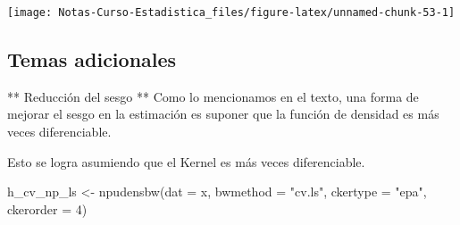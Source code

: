 \documentclass[
  12pt,
]{book}
\newenvironment{Shaded}{\begin{snugshade}}{\end{snugshade}}
\newcommand{\AttributeTok}[1]{\textcolor[rgb]{0.77,0.63,0.00}{#1}}
\newcommand{\DecValTok}[1]{\textcolor[rgb]{0.00,0.00,0.81}{#1}}
\newcommand{\FunctionTok}[1]{\textcolor[rgb]{0.00,0.00,0.00}{#1}}
\newcommand{\NormalTok}[1]{#1}
\newcommand{\OtherTok}[1]{\textcolor[rgb]{0.56,0.35,0.01}{#1}}
\newcommand{\SpecialCharTok}[1]{\textcolor[rgb]{0.00,0.00,0.00}{#1}}
\newcommand{\StringTok}[1]{\textcolor[rgb]{0.31,0.60,0.02}{#1}}
\theoremstyle{definition}
\theoremstyle{definition}
\theoremstyle{definition}
\theoremstyle{remark}
\begin{document}
\begin{Shaded}
\end{Shaded}

\begin{center}\texttt{[image: Notas-Curso-Estadistica\_files/figure-latex/unnamed-chunk-53-1]} \end{center}

\hypertarget{temas-adicionales}{%
\subsection{Temas adicionales}\label{temas-adicionales}}

** Reducción del sesgo **
Como lo mencionamos en el texto, una forma de mejorar el sesgo en la estimación es suponer que la función de densidad es más veces diferenciable.

Esto se logra asumiendo que el Kernel es más veces diferenciable.

\begin{Shaded}
\begin{Highlighting}[]
\NormalTok{h\_cv\_np\_ls }\OtherTok{\textless{}{-}} \FunctionTok{npudensbw}\NormalTok{(}\AttributeTok{dat =}\NormalTok{ x, }\AttributeTok{bwmethod =} \StringTok{"cv.ls"}\NormalTok{, }
    \AttributeTok{ckertype =} \StringTok{"epa"}\NormalTok{, }\AttributeTok{ckerorder =} \DecValTok{4}\NormalTok{)}
\end{Highlighting}
\end{Shaded}
\end{document}
